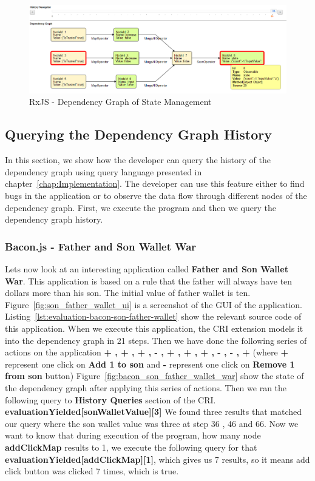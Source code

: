 \begin{figure}[!h]
	\centering
	\includegraphics[width=\textwidth,height=\textheight,keepaspectratio]{gfx/evaluation/rxjs_state_save.png}
	\caption{RxJS - Dependency Graph of State Management}
	\label{fig:rxjs_state_save}
\end{figure}

\subsection{Querying the Dependency Graph History}
In this section, we show how the developer can query the history of the dependency graph using query language presented in chapter~\ref{chap:Implementation}. The developer can use this feature either to find bugs in the application or to observe the data flow through different nodes of the dependency graph. First, we execute the program and then we query the dependency graph history.

\subsubsection{Bacon.js - Father and Son Wallet War}

Let\textquotesingle s now look at an interesting application called \textbf{Father and Son Wallet War}. This application is based on a rule that the father will always have ten dollars more than his son. The initial value of father wallet is ten. Figure~\ref{fig:son_father_wallet_ui} is a screenshot of the GUI of the application. Listing~\ref{lst:evaluation-bacon-son-father-wallet} show the relevant source code of this application. When we execute this application, the CRI extension models it into the dependency graph in 21 steps. Then we have done the following series of actions on the application \textbf{+ , + , + , - , + , + , + , - , - , +}  (where \textbf{+} represent one click on \textbf{Add 1 to son} and \textbf{-} represent one click on \textbf{Remove 1 from  son} button)
Figure~\ref{fig:bacon_son_father_wallet_war} show the state of the dependency graph after applying this series of actions.
Then we ran the following query to \textbf{History Queries} section of the CRI.  \textbf{evaluationYielded[sonWalletValue][3]}
We found three results that matched our query where the son wallet value was three at step 36 , 46 and 66.
Now we want to know that during execution of the program, how many node \textbf{addClickMap} results to 1, we execute the following query for that \textbf{evaluationYielded[addClickMap][1]}, which gives us 7 results, so it means add click button was clicked 7 times, which is true. 



